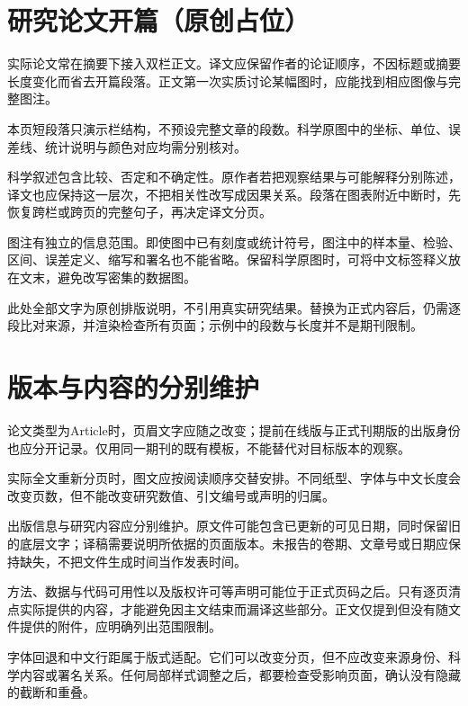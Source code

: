 \documentclass[UTF8,fontset=none,twocolumn,scheme=plain]{ctexart}
\renewcommand{\normalsize}{\fontsize{9.05bp}{11.95bp}\selectfont}
\begin{document}
\noindent\begin{minipage}[t]{\dimexpr\linewidth/2-6bp\relax}\vspace{0pt}\normalsize
\section*{研究论文开篇（原创占位）}
实际论文常在摘要下接入双栏正文。译文应保留作者的论证顺序，不因标题或摘要长度变化而省去开篇段落。正文第一次实质讨论某幅图时，应能找到相应图像与完整图注。\par
本页短段落只演示栏结构，不预设完整文章的段数。科学原图中的坐标、单位、误差线、统计说明与颜色对应均需分别核对。
\par 科学叙述包含比较、否定和不确定性。原作者若把观察结果与可能解释分别陈述，译文也应保持这一层次，不把相关性改写成因果关系。段落在图表附近中断时，先恢复跨栏或跨页的完整句子，再决定译文分页。
\par 图注有独立的信息范围。即使图中已有刻度或统计符号，图注中的样本量、检验、区间、误差定义、缩写和署名也不能省略。保留科学原图时，可将中文标签释义放在文末，避免改写密集的数据图。
\par 此处全部文字为原创排版说明，不引用真实研究结果。替换为正式内容后，仍需逐段比对来源，并渲染检查所有页面；示例中的段数与长度并不是期刊限制。
\end{minipage}\hfill\begin{minipage}[t]{\dimexpr\linewidth/2-6bp\relax}\vspace{0pt}\normalsize
\section*{版本与内容的分别维护}
论文类型为Article时，页眉文字应随之改变；提前在线版与正式刊期版的出版身份也应分开记录。仅用同一期刊的既有模板，不能替代对目标版本的观察。\par
实际全文重新分页时，图文应按阅读顺序交替安排。不同纸型、字体与中文长度会改变页数，但不能改变研究数值、引文编号或声明的归属。
\par 出版信息与研究内容应分别维护。原文件可能包含已更新的可见日期，同时保留旧的底层文字；译稿需要说明所依据的页面版本。未报告的卷期、文章号或日期应保持缺失，不把文件生成时间当作发表时间。
\par 方法、数据与代码可用性以及版权许可等声明可能位于正式页码之后。只有逐页清点实际提供的内容，才能避免因主文结束而漏译这些部分。正文仅提到但没有随文件提供的附件，应明确列出范围限制。
\par 字体回退和中文行距属于版式适配。它们可以改变分页，但不应改变来源身份、科学内容或署名关系。任何局部样式调整之后，都要检查受影响页面，确认没有隐藏的截断和重叠。
\end{minipage}
\end{document}
